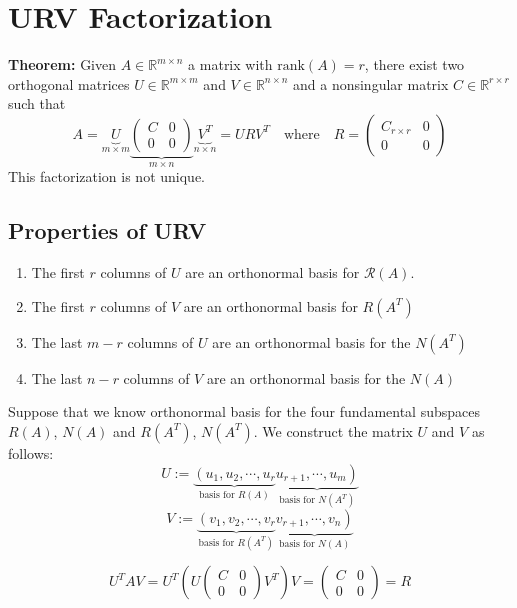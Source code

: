 \chapter{URV Factorization}
\textbf{Theorem:} Given $A \in \mathbb{R}^{m \times n}$ a matrix with $\text{rank}(A)=r$, there exist two orthogonal matrices $U \in \mathbb{R}^{m \times m}$ and $V \in \mathbb{R}^{n \times n}$ and a nonsingular matrix $C \in \mathbb{R}^{r \times r}$ such that
\[
A =
\underbrace{U}_{m \times m}
\underbrace{
    \begin{pmatrix}
    C & 0 \\
    0 & 0
    \end{pmatrix}
}_{m \times n}
\underbrace{V^T}_{n \times n} = URV^T
\quad
\text{where}
\quad
R = \begin{pmatrix}
C_{r \times r} & 0 \\
0 & 0
\end{pmatrix}
\]
This factorization is not unique.

\section{Properties of URV}
\begin{enumerate}
\item The first $r$ columns of $U$ are an orthonormal basis for $\mathcal{R}(A)$.
\item The first $r$ columns of $V$ are an orthonormal basis for $R(A^T)$
\item The last $m-r$ columns of $U$ are an orthonormal basis for the $N(A^T)$
\item The last $n-r$ columns of $V$ are an orthonormal basis for the $N(A)$
\end{enumerate}

Suppose that we know orthonormal basis for the four fundamental subspaces
$R(A)$, $N(A)$ and $R(A^T)$, $N(A^T)$.
We construct the matrix $U$ and $V$ as follows:
$$U := \underbrace{\left(u_1, u_2, \cdots, u_r\right.}_{\text{basis for } R(A)} \underbrace{\left.u_{r+1}, \cdots, u_m\right)}_{\text{basis for } N(A^T)}$$
$$V := \underbrace{\left(v_1, v_2, \cdots, v_r\right.}_{\text{basis for } R(A^T)} \underbrace{\left.v_{r+1}, \cdots, v_n\right)}_{\text{basis for } N(A)}$$

\[
U^T A V = U^T \left( U \begin{pmatrix}
C & 0 \\
0 & 0
\end{pmatrix} V^T \right) V = \begin{pmatrix}
C & 0 \\
0 & 0
\end{pmatrix} = R
\]

